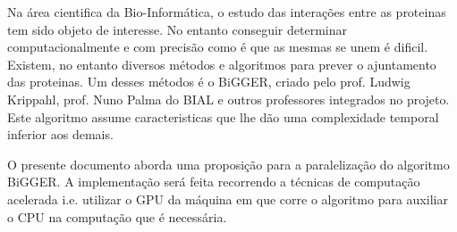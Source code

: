 


%
%
Na área cientifica da Bio-Informática, o estudo das interações entre as proteinas tem sido objeto de interesse. 
No entanto conseguir determinar computacionalmente e com precisão como é que as mesmas se unem é dificil. 
Existem, no entanto diversos métodos e algoritmos para prever o ajuntamento das proteinas. 
Um desses métodos é o BiGGER, criado pelo prof. Ludwig Krippahl, prof. Nuno Palma do BIAL e outros professores integrados no projeto. 
Este algoritmo assume caracteristicas que lhe dão uma complexidade temporal inferior aos demais.

O presente documento aborda uma proposição para a paralelização do algoritmo BiGGER.
 A implementação será feita recorrendo a técnicas de computação acelerada i.e. utilizar o GPU da máquina em que corre o algoritmo para auxiliar o CPU na computação que é necessária. 
 
